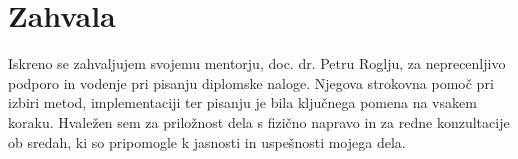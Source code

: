 \documentclass[12pt,a4paper,titlepage,openany]{report}
\begin{document}
\begin{center}
\end{center}





\newpage
\section*{Zahvala}
Iskreno se zahvaljujem svojemu mentorju, doc. dr. Petru Roglju, za neprecenljivo podporo in vodenje pri pisanju diplomske naloge. Njegova strokovna pomoč pri izbiri metod, implementaciji ter pisanju je bila ključnega pomena na vsakem koraku. Hvaležen sem za priložnost dela s fizično napravo in za redne konzultacije ob sredah, ki so pripomogle k jasnosti in uspešnosti mojega dela.
\end{document}
